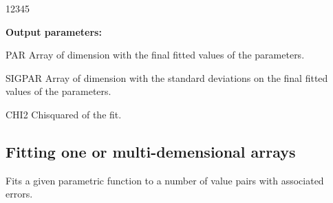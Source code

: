 \begin{DLtt}{12345}
\item[{\rm\bf Output parameters:}]
\item[PAR] Array of dimension  with the final fitted values
      of the parameters.
\item[SIGPAR] Array of dimension  with the standard deviations
      on the final fitted values of the parameters.
\item[CHI2] Chisquared of the fit.
\end{DLtt}
 
\subsection{Fitting one or multi-demensional arrays}

 
\Action
Fits a given parametric function to a number of value pairs
with associated errors.
 
